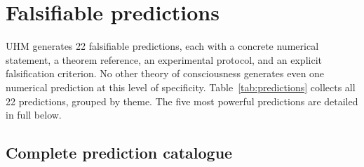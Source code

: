 
\section{Falsifiable predictions}
\label{sec:predictions}

UHM generates 22 falsifiable predictions, each with a concrete numerical
statement, a theorem reference, an experimental protocol, and an explicit
falsification criterion. No other theory of consciousness generates even
one numerical prediction at this level of specificity.
Table~\ref{tab:predictions} collects all 22 predictions, grouped by theme.
The five most powerful predictions are detailed in full below.

\subsection{Complete prediction catalogue}


